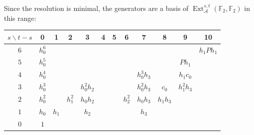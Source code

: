 \documentclass[11pt]{article}
\newcommand{\F}{\mathbb{F}_2}
\newcommand{\A}{\mathcal{A}}
\DeclareMathOperator{\Ext}{Ext}
\begin{document}
Since the resolution is minimal, the generators are a basis of $\Ext_\A^{s,t}(\F, \F)$ in this range:
\begin{center}\footnotesize\setlength{\tabcolsep}{3pt}
\begin{tabular}{c|ccccccccccc}
$s \backslash t-s$ & 0 & 1 & 2 & 3 & 4 & 5 & 6 & 7 & 8 & 9 & 10 \\
\midrule
$6$ & $h_0^6$ &  &  &  &  &  &  &  &  &  & $h_1Ph_1$ \\
$5$ & $h_0^5$ &  &  &  &  &  &  &  &  & $Ph_1$ &  \\
$4$ & $h_0^4$ &  &  &  &  &  &  & $h_0^3h_3$ &  & $h_1c_0$ &  \\
$3$ & $h_0^3$ &  &  & $h_0^2h_2$ &  &  &  & $h_0^2h_3$ & $c_0$ & $h_1^2h_3$ &  \\
$2$ & $h_0^2$ &  & $h_1^2$ & $h_0h_2$ &  &  & $h_2^2$ & $h_0h_3$ & $h_1h_3$ &  &  \\
$1$ & $h_0$ & $h_1$ &  & $h_2$ &  &  &  & $h_3$ &  &  &  \\
$0$ & $1$ &  &  &  &  &  &  &  &  &  &  \\
\end{tabular}
\end{center}
\end{document}
